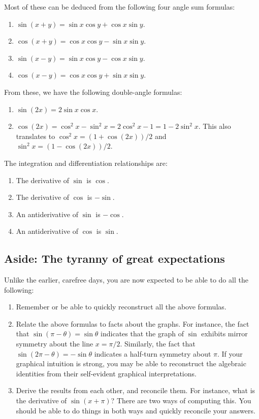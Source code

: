 \documentclass{amsart}
\begin{document}
Most of these can be deduced from the following four angle sum formulas:

\begin{enumerate}
\item $\sin(x + y) = \sin x \cos y + \cos x \sin y$.
\item $\cos(x + y) = \cos x \cos y - \sin x \sin y$.
\item $\sin(x - y) = \sin x \cos y - \cos x \sin y$.
\item $\cos(x - y) = \cos x \cos y + \sin x \sin y$.
\end{enumerate}

From these, we have the following double-angle formulas:

\begin{enumerate}
\item $\sin(2x) = 2 \sin x \cos x$.
\item $\cos(2x) = \cos^2 x - \sin^2 x = 2\cos^2 x - 1 = 1 - 2\sin^2
  x$. This also translates to $\cos^2 x = (1 + \cos (2x))/2$ and $\sin^2 x
  = (1 - \cos(2x))/2$.
\end{enumerate}

The integration and differentiation relationships are:

\begin{enumerate}
\item The derivative of $\sin$ is $\cos$.
\item The derivative of $\cos$ is $-\sin$.
\item An antiderivative of $\sin$ is $-\cos$.
\item An antiderivative of $\cos$ is $\sin$.
\end{enumerate}

\subsection*{Aside: The tyranny of great expectations}

Unlike the earlier, carefree days, you are now expected to be able to
do all the following:

\begin{enumerate}
\item Remember or be able to quickly reconstruct all the above formulas.
\item Relate the above formulas to facts about the graphs. For
  instance, the fact that $\sin(\pi - \theta) = \sin \theta$ indicates
  that the graph of $\sin$ exhibits mirror symmetry about the line $x
  = \pi/2$. Similarly, the fact that $\sin(2 \pi - \theta) = - \sin
  \theta$ indicates a half-turn symmetry about $\pi$. If your
  graphical intuition is strong, you may be able to reconstruct the
  algebraic identities from their self-evident graphical
  interpretations.
\item Derive the results from each other, and reconcile them. For
  instance, what is the derivative of $\sin (x + \pi)$? There are two
  ways of computing this. You should be able to do things in both ways
  and quickly reconcile your answers.
\end{enumerate}
\end{document}
